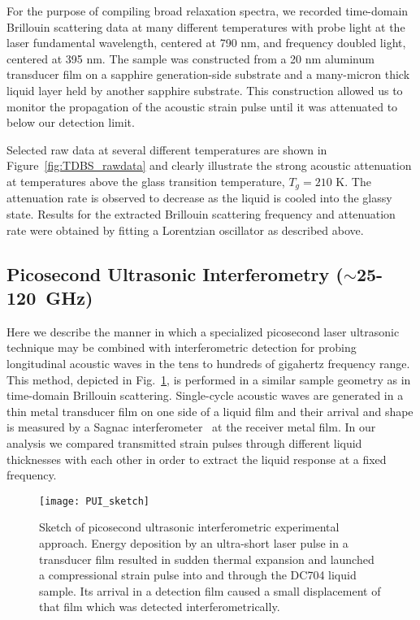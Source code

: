 \documentclass[reprint,showpacs,amsmath,amssymb,aip,jcp]{revtex4-1}
\begin{document}
For the purpose of compiling broad relaxation spectra, we recorded
time-domain Brillouin scattering data at many different temperatures
with probe light at the laser fundamental wavelength, centered at 790
nm, and frequency doubled light, centered at 395 nm. The sample was
constructed from a 20 nm aluminum transducer film on a sapphire
generation-side substrate and a many-micron thick liquid layer held by
another sapphire substrate. This construction allowed us to monitor
the propagation of the acoustic strain pulse until it was attenuated
to below our detection limit.

Selected raw data at several different temperatures are shown in
Figure~\ref{fig:TDBS_rawdata} and clearly illustrate the strong
acoustic attenuation at temperatures above the glass transition
temperature, $T_g=210$ K. The attenuation rate is observed to decrease
as the liquid is cooled into the glassy state. Results for the
extracted Brillouin scattering frequency and attenuation rate were
obtained by fitting a Lorentzian oscillator as described above.

\subsection{Picosecond Ultrasonic Interferometry
  ($\sim$25-120~GHz)}\label{sec:PUI}

Here we describe the manner in which a specialized picosecond laser
ultrasonic technique may be combined with interferometric detection
for probing longitudinal acoustic waves in the tens to hundreds of
gigahertz frequency range. This method, depicted in Fig.\
\ref{fig:PUI_sketch}, is performed in a similar sample geometry as in
time-domain Brillouin scattering. Single-cycle acoustic waves are
generated in a thin metal transducer film on one side of a liquid film
and their arrival and shape is measured by a Sagnac
interferometer~\cite{sHurley1999,sPerrin1999} at the receiver metal
film. In our analysis we compared transmitted strain pulses through
different liquid thicknesses with each other in order to extract the
liquid response at a fixed frequency.

\begin{figure}[ht!]
  \centering
  \texttt{[image: PUI\_sketch]}
  \caption{\label{fig:PUI_sketch}Sketch of picosecond ultrasonic
    interferometric experimental approach. Energy deposition by an
    ultra-short laser pulse in a transducer film resulted in sudden
    thermal expansion and launched a compressional strain pulse into
    and through the DC704 liquid sample. Its arrival in a detection
    film caused a small displacement of that film which was detected
    interferometrically.}
\end{figure}
\end{document}
